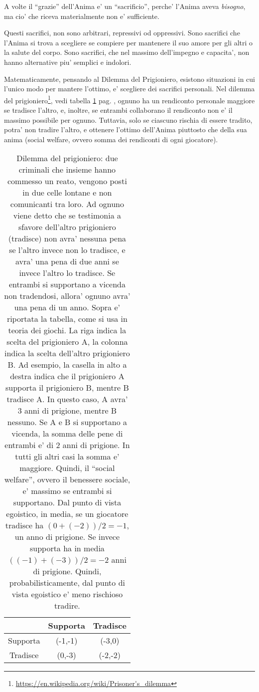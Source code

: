 A volte il ``grazie'' dell'Anima e' un ``sacrificio'', perche' l'Anima aveva \emph{bisogno}, ma cio' che riceva materialmente non e' sufficiente.

Questi sacrifici, non sono arbitrari, repressivi od oppressivi. Sono sacrifici che l'Anima si trova a scegliere se compiere per mantenere il suo amore per gli altri o la salute del corpo. Sono sacrifici, che nel massimo dell'impegno e capacita', non hanno alternative piu' semplici e indolori.

Matematicamente, pensando al Dilemma del Prigioniero, esistono situazioni in cui l'unico modo per mantere l'ottimo, e' scegliere dei sacrifici personali. Nel dilemma del prigioniero\footnote{\url{https://en.wikipedia.org/wiki/Prisoner's\_dilemma}}, vedi tabella \ref{tabPrisonerDilemma} pag. \pageref{tabPrisonerDilemma}, ognuno ha un rendiconto personale maggiore se tradisce l'altro, e, inoltre, se entrambi collaborano il rendiconto non e' il massimo possibile per ognuno. Tuttavia, solo se ciascuno rischia di essere tradito, potra' non tradire l'altro, e ottenere l'ottimo dell'Anima piuttosto che della sua anima (social welfare, ovvero somma dei rendiconti di ogni giocatore).

\begin{center}
    \begin{table}
        \begin{tabular}{ |c|c|c| }
            \hline
            &  Supporta   &   Tradisce \\
            \hline
            Supporta   & (-1,-1) & (-3,0) \\
            \hline
            Tradisce & (0,-3) & (-2,-2) \\
            \hline
        \end{tabular}
        \caption{\label{tabPrisonerDilemma}Dilemma del prigioniero: due criminali che insieme hanno commesso un reato, vengono posti in due celle lontane e non comunicanti tra loro. Ad ognuno viene detto che se testimonia a sfavore dell'altro prigioniero (tradisce) non avra' nessuna pena se l'altro invece non lo tradisce, e avra' una pena di due anni se invece l'altro lo tradisce. Se entrambi si supportano a vicenda non tradendosi, allora' ognuno avra' una pena di un anno. Sopra e' riportata la tabella, come si usa in teoria dei giochi. La riga indica la scelta del prigioniero A, la colonna indica la scelta dell'altro prigioniero B. Ad esempio, la casella in alto a destra indica che il prigioniero A supporta il prigioniero B, mentre B tradisce A. In questo caso, A avra' 3 anni di prigione, mentre B nessuno. Se A e B si supportano a vicenda, la somma delle pene di entrambi e' di 2 anni di prigione. In tutti gli altri casi la somma e' maggiore. Quindi, il ``social welfare'', ovvero il benessere sociale, e' massimo se entrambi si supportano. Dal punto di vista egoistico, in media, se un giocatore tradisce ha $(0+(-2))/2 = -1$, un anno di prigione. Se invece supporta ha in media $((-1)+(-3))/2=-2$ anni di prigione. Quindi, probabilisticamente, dal punto di vista egoistico e' meno rischioso tradire. }

    \end{table}
\end{center}




